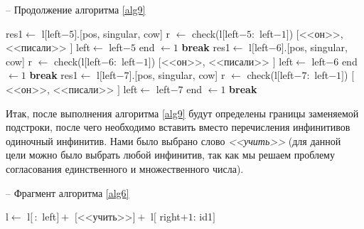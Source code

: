 \documentclass[main]{subfiles}
\begin{document}
\begin{algorithm}
	\caption{-- Продолжение алгоритма \ref{alg9}}\label{alg10}
	\begin{algorithmic}[1]
			\EndIf
			\EndFor
			\EndIf
			\State res1$\gets$ l$[$left$-5]$.[pos, singular, cow]
			\State r $\gets$ check(l$[$left$-5:$ left$-1]$)
			\State \Return $[$<<он>>, <<писали>> $]$
			\State left$\gets$ left$-5$
			\State end $\gets 1$
			\State \textbf{break}
			\EndIf
			\EndIf
			\EndFor
			\EndIf
			\State res1$\gets$ l$[$left$-6]$.[pos, singular, cow]
			\State r $\gets$ check(l$[$left$-6:$ left$-1]$)
			\State \Return $[$<<он>>, <<писали>> $]$
			\State left$\gets$ left$-6$
			\State end $\gets 1$
			\State \textbf{break}
			\EndIf
			\EndIf
			\EndFor
			\EndIf
			\State res1$\gets$ l$[$left$-7]$.[pos, singular, cow]
			\State r $\gets$ check(l$[$left$-7:$ left$-1]$)
			\State \Return $[$<<он>>, <<писали>> $]$
			\State left$\gets$ left$-7$
			\State end $\gets 1$
			\State \textbf{break}
			\EndIf
			\EndIf
			\EndFor
			\EndIf
	\end{algorithmic}
\end{algorithm}

Итак, после выполнения алгоритма \ref{alg9} будут определены границы заменяемой подстроки, после чего необходимо вставить вместо перечисления инфинитивов одиночный инфинитив. Нами было выбрано слово \textit{<<учить>>} (для данной цели можно было выбрать любой инфинитив, так как мы решаем проблему согласования единственного и множественного числа).

\begin{algorithm}
	\caption{-- Фрагмент алгоритма \ref{alg6}}\label{alg11}
	\begin{algorithmic}[1]
		\State l$\gets$ l$[\,:$ left$] +$ $[$<<учить>>$]+$ l$[$ right$+1:\, $id1$]$
	\end{algorithmic}
\end{algorithm}
\end{document}
